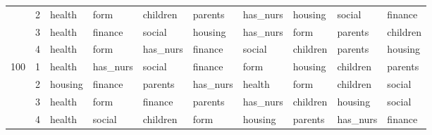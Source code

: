 \begin{table}[htbp]
\begin{tabular}{llllllllll}
 & 2 & health & form & children & parents & has_nurs & housing & social & finance \\
 & 3 & health & finance & social & housing & has_nurs & form & parents & children \\
 & 4 & health & form & has_nurs & finance & social & children & parents & housing \\
\multirow[c]{4}{*}{100} & 1 & health & has_nurs & social & finance & form & housing & children & parents \\
 & 2 & housing & finance & parents & has_nurs & health & form & children & social \\
 & 3 & health & form & finance & parents & has_nurs & children & housing & social \\
 & 4 & health & social & children & form & housing & parents & has_nurs & finance \\
\bottomrule
\end{tabular}
\end{table}

